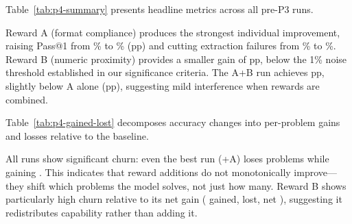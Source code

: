 Table~\ref{tab:p4-summary} presents headline metrics across all pre-P3 runs.



Reward A (format compliance) produces the strongest individual improvement, raising Pass@1 from \pFourBaselinePassOne\% to \pFourSeparateAPassOne\% (\pFourSeparateADeltaPassOne{}pp) and cutting extraction failures from \pFourBaselineExtrFail\% to \pFourSeparateAExtrFail\%.
Reward B (numeric proximity) provides a smaller gain of \pFourSeparateBDeltaPassOne{}pp, below the 1\% noise threshold established in our significance criteria.
The A+B run achieves \pFourCombinedAbDeltaPassOne{}pp, slightly below A alone (\pFourSeparateADeltaPassOne{}pp), suggesting mild interference when rewards are combined.

Table~\ref{tab:p4-gained-lost} decomposes accuracy changes into per-problem gains and losses relative to the baseline.



All runs show significant churn: even the best run (+A) loses \pFourSeparateALost{} problems while gaining \pFourSeparateAGained.
This indicates that reward additions do not monotonically improve---they shift which problems the model solves, not just how many.
Reward B shows particularly high churn relative to its net gain (\pFourSeparateBGained{} gained, \pFourSeparateBLost{} lost, net \pFourSeparateBNet), suggesting it redistributes capability rather than adding it.
